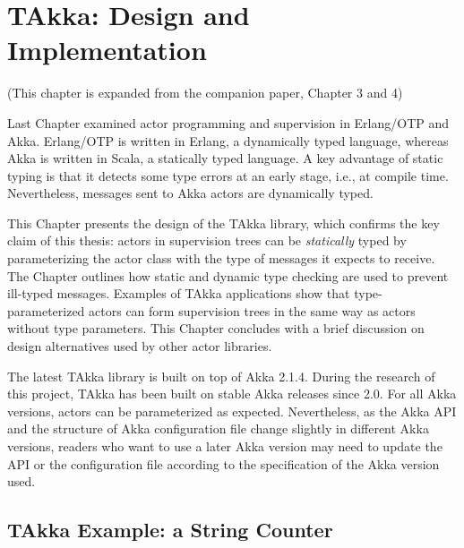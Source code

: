 \chapter{TAkka: Design and Implementation}
\label{takka_design}

\begin{center}
(This chapter is expanded from the companion paper, Chapter 3 and 4)
\end{center}
\vspace{12 pt}

Last Chapter examined actor programming and supervision in Erlang/OTP and Akka. 
 Erlang/OTP is written in Erlang, a dynamically typed language, whereas Akka is 
written in Scala, a statically typed language. A key advantage of static typing 
is that it detects some type errors at an early stage, i.e., at compile time.  
Nevertheless, messages sent to Akka actors are dynamically typed. 

\begin{comment}
because it was believed that 
type parameterized actors and supervision will be difficult
to work together [? private communication and mailing list question ?] .
\end{comment}

This Chapter presents the design of the TAkka library, which confirms the key 
claim of this thesis: actors in supervision trees can be 
{\it statically} typed by parameterizing the actor class with the type of 
messages it expects to receive.  The Chapter outlines how 
static and dynamic type checking are used to prevent ill-typed messages.  
Examples of TAkka applications show that type-parameterized actors can form 
supervision trees in the same way as actors without type parameters.  This 
Chapter concludes with a brief discussion on design alternatives used by 
other actor libraries.

The latest TAkka library is built on top of Akka 2.1.4.  During the research 
of this project, TAkka has been built on stable Akka releases since 2.0.  For 
all Akka versions, actors can be parameterized as expected.  
Nevertheless, as the Akka API and the structure of Akka configuration file change 
slightly in different Akka versions, readers who want to use a later Akka 
version may need to update the API or the configuration file according to the 
specification of the Akka version used.


\section{TAkka Example: a String Counter}
\label{sec:takka_example}

